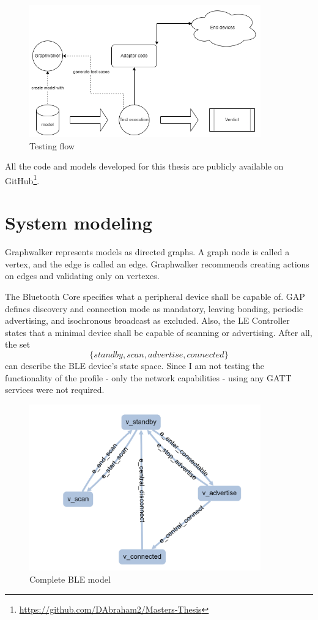\begin{figure}
    \centering
    \includegraphics[width=100mm, keepaspectratio]{figures/process_use_case.png}
    \caption{Testing flow}
    \label{fig:meth:test_flow}
\end{figure}

All the code and models developed for this thesis are publicly available on GitHub\footnote{\url{https://github.com/DAbraham2/Masters-Thesis}}.



\section{System modeling}
\label{sec:meth:sys_mod}

Graphwalker represents models as directed graphs. A graph node is called a vertex, and the edge is called an edge. Graphwalker recommends creating actions on edges and validating only on vertexes.

The Bluetooth Core specifies what a peripheral device shall be capable of. GAP defines discovery and connection mode as mandatory, leaving bonding, periodic advertising, and isochronous broadcast as excluded. Also, the LE Controller states that a minimal device shall be capable of scanning or advertising. After all, the set \[
    \{standby, scan, advertise, connected\}
\] can describe the BLE device's state space. Since I am not testing the functionality of the profile - only the network capabilities - using any GATT services were not required.

\begin{figure}
    \includegraphics[width=100mm, keepaspectratio]{figures/model_ble_final.png}
    \caption{Complete BLE model}
\end{figure}

